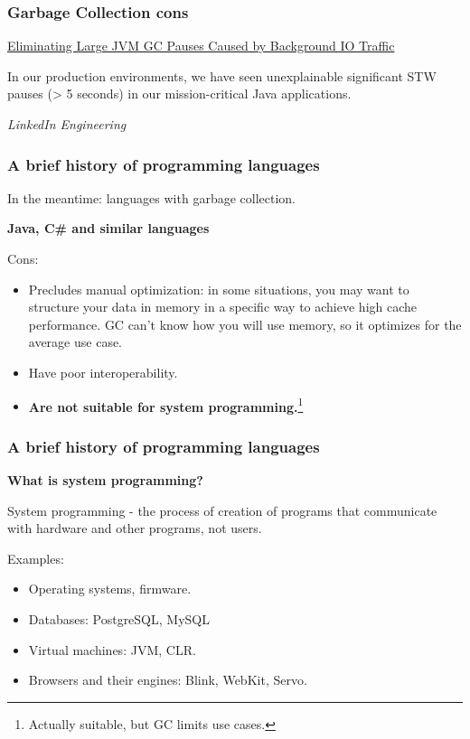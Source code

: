 \documentclass[aspectratio=1610,t]{beamer}
\begin{document}

\begin{frame}
\frametitle{Garbage Collection cons}
\href{https://engineering.linkedin.com/blog/2016/02/eliminating-large-jvm-gc-pauses-caused-by-background-io-traffic}{Eliminating Large JVM GC Pauses Caused by Background IO Traffic}

In our production environments, we have seen unexplainable significant STW pauses (> 5 seconds) in our mission-critical Java applications.

\begin{flushright}\textit{LinkedIn Engineering}\end{flushright}

\end{frame}


\begin{frame}
\frametitle{A brief history of programming languages}
In the meantime: languages with garbage collection.

\textbf{Java, C\# and similar languages}

Cons:
\begin{itemize}
    \item Precludes manual optimization: in some situations, you may want to structure your data in memory in a specific way to achieve high cache performance. GC can't know how you will use memory, so it optimizes for the average use case.
    \item Have poor interoperability.
    \item \textbf{Are not suitable for system programming.}\footnote{Actually suitable, but GC limits use cases.}
\end{itemize}
\end{frame}


\begin{frame}
\frametitle{A brief history of programming languages}
\textbf{What is system programming?}

System programming - the process of creation of programs that communicate with hardware and other programs, not users.

Examples:
\begin{itemize}
    \item Operating systems, firmware.
    \item Databases: PostgreSQL, MySQL
    \item Virtual machines: JVM, CLR.
    \item Browsers and their engines: Blink, WebKit, Servo.
\end{itemize}
\end{frame}
\end{document}
